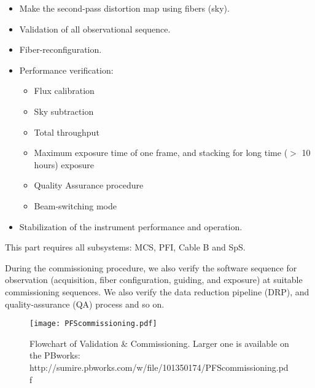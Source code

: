 \begin{enumerate}
\begin{itemize}
 \item Make the second-pass distortion map using fibers (sky).
 \item Validation of all observational sequence.
 \item Fiber-reconfiguration.
 \item Performance verification:
 	\begin{itemize}
	\item Flux calibration
	\item Sky subtraction
	\item Total throughput
	\item Maximum exposure time of one frame, and stacking for long time ($>$ 10 hours) exposure
	\item Quality Assurance procedure
	\item Beam-switching mode
 \end{itemize}
 \item Stabilization of the instrument performance and operation.
 \end{itemize}
This part requires all subsystems: MCS, PFI, Cable B and SpS.
\end{enumerate}

During the commissioning procedure, we also verify the software sequence for observation (acquisition, fiber configuration, guiding, and exposure) at suitable commissioning sequences.
We also verify the data reduction pipeline (DRP), and quality-assurance (QA) process and so on.


\begin{landscape}
\begin{figure}[!ht]
\begin{center}
\vspace*{80mm}
\hspace*{-10mm}
\texttt{[image: PFScommissioning.pdf]}
\end{center}
\vspace*{-90mm}
\caption{Flowchart of Validation \& Commissioning. Larger one is available on the PBworks: \newline
http://sumire.pbworks.com/w/file/101350174/PFScommissioning.pdf
}
\label{fig:flowchart}
\end{figure}
\end{landscape}

